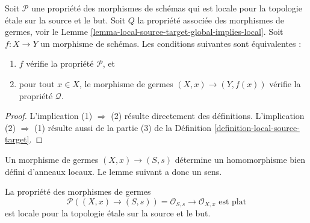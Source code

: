 \begin{lemma}
\label{lemma-local-source-target-local-implies-global}
Soit $\mathcal{P}$ une propriété des morphismes de schémas qui est
locale pour la topologie \'etale sur la source et le but. Soit $Q$ la
propriété associée des morphismes de germes, voir le
Lemme \ref{lemma-local-source-target-global-implies-local}.
Soit $f : X \to Y$ un morphisme de schémas. Les conditions suivantes
sont équivalentes :
\begin{enumerate}
\item $f$ vérifie la propriété $\mathcal{P}$, et
\item pour tout $x \in X$, le morphisme de germes
$(X, x) \to (Y, f(x))$ vérifie la propriété $\mathcal{Q}$.
\end{enumerate}
\end{lemma}

\begin{proof}
L'implication (1) $\Rightarrow$ (2) résulte directement des définitions.
L'implication (2) $\Rightarrow$ (1) résulte aussi de la partie (3) de la
Définition \ref{definition-local-source-target}.
\end{proof}

\noindent
Un morphisme de germes $(X, x) \to (S, s)$ détermine un homomorphisme
bien défini d'anneaux locaux. Le lemme suivant a donc un sens.

\begin{lemma}
\label{lemma-flat-at-point}
La propriété des morphismes de germes
$$
\mathcal{P}((X, x) \to (S, s)) =
\mathcal{O}_{S, s} \to \mathcal{O}_{X, x}\text{ est plat}
$$
est locale pour la topologie \'etale sur la source et le but.
\end{lemma}

